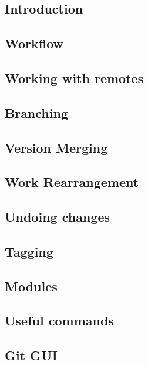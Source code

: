 \subsection{Introduction}



\subsection{Workflow}



\subsection{Working with remotes}



\subsection{Branching}



\subsection{Version Merging}



\subsection{Work Rearrangement}



\subsection{Undoing changes}



\subsection{Tagging}



\subsection{Modules}



\subsection{Useful commands}



\subsection{Git GUI}


